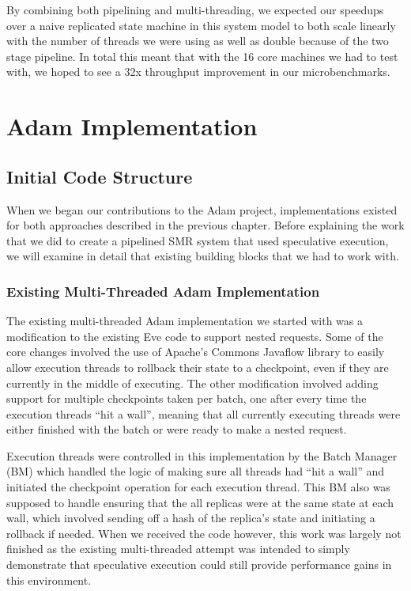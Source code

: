 \documentclass[11pt, oneside]{report}
\begin{document}
By combining both pipelining and multi-threading, we expected our speedups over a naive replicated state machine in this system model to both scale linearly with the number of threads we were using as well as double because of the two stage pipeline. 
In total this meant that with the 16 core machines we had to test with, we hoped to see a 32x throughput improvement in our microbenchmarks.

\chapter{Adam Implementation}\label{AdamImplementation}

\section{Initial Code Structure}

When we began our contributions to the Adam project, implementations existed for both approaches described in the previous chapter. 
Before explaining the work that we did to create a pipelined SMR system that used speculative execution, we will examine in detail that existing building blocks that we had to work with.

\subsection{Existing Multi-Threaded Adam Implementation}

The existing multi-threaded Adam implementation we started with was a modification to the existing Eve code to support nested requests. 
Some of the core changes involved the use of Apache's Commons Javaflow library to easily allow execution threads to rollback their state to a checkpoint, even if they are currently in the middle of executing. 
The other modification involved adding support for multiple checkpoints taken per batch, one after every time the execution threads ``hit a wall'', meaning that all currently executing threads were either finished with the batch or were ready to make a nested request.

Execution threads were controlled in this implementation by the Batch Manager (BM) which handled the logic of making sure all threads had ``hit a wall'' and initiated the checkpoint operation for each execution thread. 
This BM also was supposed to handle ensuring that the all replicas were at the same state at each wall, which involved sending off a hash of the replica's state and initiating a rollback if needed. 
When we received the code however, this work was largely not finished as the existing multi-threaded attempt was intended to simply demonstrate that speculative execution could still provide performance gains in this environment.
\end{document}
